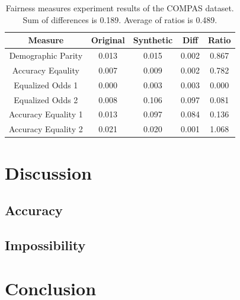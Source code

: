 \documentclass[acmsmall,sigconf]{acmart}
\begin{document}
\begin{table}[h]
\caption{Fairness measures experiment results of the COMPAS dataset. Sum of differences is 0.189. Average of ratios is 0.489.}
\label{tab:diabetes_score}
\begin{tabular}{ccccc}
\toprule
\textbf{Measure} & \textbf{Original} & \textbf{Synthetic} & \textbf{Diff} & \textbf{Ratio} \\
\midrule
Demographic Parity  & 0.013 & 0.015 & 0.002 & 0.867 \\
Accuracy Eqaulity   & 0.007 & 0.009 & 0.002 & 0.782 \\
Equalized Odds 1    & 0.000 & 0.003 & 0.003 & 0.000 \\
Equalized Odds 2    & 0.008 & 0.106 & 0.097 & 0.081 \\
Accuracy Equality 1 & 0.013 & 0.097 & 0.084 & 0.136 \\
Accuracy Equality 2 & 0.021 & 0.020 & 0.001 & 1.068 \\
\bottomrule
\end{tabular}
\end{table}

\section{Discussion}

\subsection{Accuracy}

\subsection{Impossibility}

\section{Conclusion}










\end{document}
